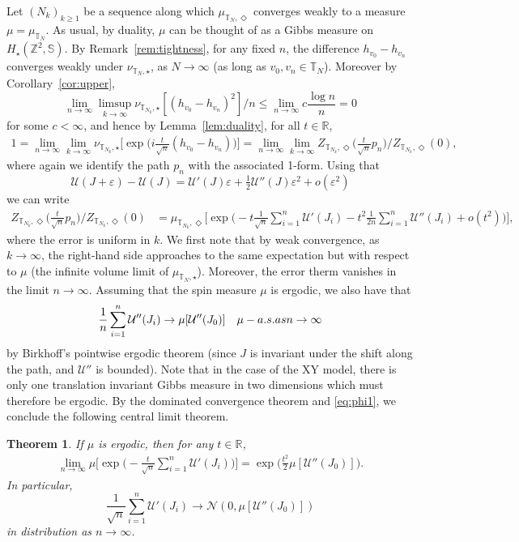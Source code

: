 \documentclass[11pt, reqno]{amsart}
\newtheorem{theorem}{Theorem}[section]
\numberwithin{equation}{section}
\theoremstyle{definition}
\theoremstyle{remark}
\newcommand{\exact}{\star}
\newcommand{\coclosed}{\Diamond}
\begin{document}
Let $(N_k)_{k\geq1}$ be a sequence along which $\mu_{\mathbb{T}_N, \coclosed}$ converges weakly to a measure $\mu=\mu_{\mathbb{T}_N}$. As usual, by duality, $\mu$ can be thought of as a Gibbs measure on $H_\exact(\mathbb Z^2, \mathbb S)$.
By Remark~\ref{rem:tightness}, for any fixed $n$, the difference $h_{v_0}-h_{v_n}$ converges weakly under $\nu_{\mathbb{T}_N, \exact}$, as $N\to \infty$ (as long as $v_0,v_n\in \mathbb{T}_N$). Moreover by Corollary~\ref{cor:upper},
\[
	\lim_{n\to \infty} \limsup_{k\to \infty} \nu_{\mathbb{T}_{N_k}, \exact} [(h_{v_0}-h_{v_n})^2]/{n} \leq \lim_{n\to \infty}c \frac{ \log n }{n}= 0
\] 
for some $c<\infty$, and hence by Lemma~\ref{lem:duality}, for all $t\in \mathbb R$,
\begin{align}\label{eq:phi1}
	1= \lim_{n\to \infty} \lim_{k\to \infty} \nu_{\mathbb{T}_{N_k}, \exact}\big [\exp \big(i\tfrac t {\sqrt n} ({h_{v_0}-h_{v_n}})\big)\big]= \lim_{n\to \infty}\lim_{k\to \infty}{Z_{\mathbb{T}_{N_k},\coclosed}\big (\tfrac t  {\sqrt n}p_n\big)}/{Z_{\mathbb{T}_{N_k},\coclosed}(0)},
\end{align}
where again we identify the path $p_n$ with the associated 1-form.
Using that 
\[
\mathcal U(J+\varepsilon)-\mathcal U( J)= \mathcal U'(J)\varepsilon +\tfrac 12 \mathcal U''(J)\varepsilon^2 +o(\varepsilon^2)
\]
we can write
\begin{align*}
{Z_{\mathbb{T}_{N_k},\coclosed}\big (\tfrac t  {\sqrt n}p_n\big)}/{Z_{\mathbb{T}_{N_k},\coclosed}(0)} 
&= \mu_{\mathbb{T}_{N_k}, \coclosed} \Big [\exp \Big(-t\frac{1}{\sqrt n}\sum_{i=1}^n  \mathcal U' (J_i)  - {t^2} \frac {1}{2n} \sum_{i=1}^n \mathcal U''(J_i)+o(t^2)\Big)\Big],
\end{align*}
where the error is uniform in $k$.
We first note that by weak convergence, as $k\to \infty$, the right-hand side approaches to the same expectation but with respect to $\mu$ (the infinite volume limit of $\mu_{\mathbb{T}_N, \exact}$).
Moreover, the error therm vanishes in the limit $n\to\infty$. Assuming that the spin measure $\mu$ is ergodic, we also have that
\[
\frac 1n \sum_{i=1}^n \mathcal U'' (J_i)\to \mu[\mathcal U'' (J_0)] \quad \mu\textnormal{-a.s. as } n\to \infty
\] 
by Birkhoff's pointwise ergodic theorem (since $J$ is invariant under the shift along the path, and $\mathcal U''$ is bounded). 
Note that in the case of the XY model, there is only one translation invariant Gibbs measure in two dimensions \cite{MMSP} which must therefore be ergodic. 
By the dominated convergence theorem and \eqref{eq:phi1}, we conclude the following central limit theorem.
\begin{theorem} If $\mu$ is ergodic, then for any $t\in \mathbb R$,
\begin{align*}
\lim_{n\to \infty} \mu \Big [\exp \Big(-\frac{t}{\sqrt n}\sum_{i=1}^n  \mathcal U' (J_i)\Big)\Big] = \exp\Big(\frac{t^2}2   \mu [\mathcal U'' (J_0)] \Big).
\end{align*}
In particular,
\[
\frac1{\sqrt n}\sum_{i=1}^n  \mathcal U' (J_i)\to \mathcal N(0, \mu [\mathcal U'' (J_0)])
\]
in distribution as $n\to \infty$.
\end{theorem}
\newpage
\appendix
\end{document}

